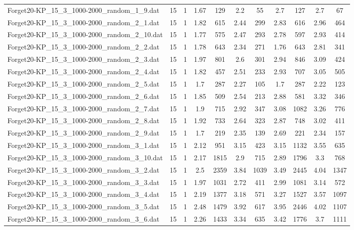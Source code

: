 \begin{table}[!ht]
\begin{tabular}{lcccccccccc}
Forget20-KP\_15\_3\_1000-2000\_random\_1\_9.dat & 15 & 1 & 1.67 & 129 & 2.2 & 55 & 2.7 & 127 & 2.7 & 67 \\
Forget20-KP\_15\_3\_1000-2000\_random\_2\_1.dat & 15 & 1 & 1.82 & 615 & 2.44 & 299 & 2.83 & 616 & 2.96 & 464 \\
Forget20-KP\_15\_3\_1000-2000\_random\_2\_10.dat & 15 & 1 & 1.77 & 575 & 2.47 & 293 & 2.78 & 597 & 2.93 & 414 \\
Forget20-KP\_15\_3\_1000-2000\_random\_2\_2.dat & 15 & 1 & 1.78 & 643 & 2.34 & 271 & 1.76 & 643 & 2.81 & 341 \\
Forget20-KP\_15\_3\_1000-2000\_random\_2\_3.dat & 15 & 1 & 1.97 & 801 & 2.6 & 301 & 2.94 & 846 & 3.09 & 424 \\
Forget20-KP\_15\_3\_1000-2000\_random\_2\_4.dat & 15 & 1 & 1.82 & 457 & 2.51 & 233 & 2.93 & 707 & 3.05 & 505 \\
Forget20-KP\_15\_3\_1000-2000\_random\_2\_5.dat & 15 & 1 & 1.7 & 287 & 2.27 & 105 & 1.7 & 287 & 2.22 & 123 \\
Forget20-KP\_15\_3\_1000-2000\_random\_2\_6.dat & 15 & 1 & 1.85 & 509 & 2.54 & 213 & 2.88 & 581 & 3.32 & 346 \\
Forget20-KP\_15\_3\_1000-2000\_random\_2\_7.dat & 15 & 1 & 1.9 & 715 & 2.92 & 347 & 3.08 & 1082 & 3.26 & 776 \\
Forget20-KP\_15\_3\_1000-2000\_random\_2\_8.dat & 15 & 1 & 1.92 & 733 & 2.64 & 323 & 2.87 & 748 & 3.02 & 411 \\
Forget20-KP\_15\_3\_1000-2000\_random\_2\_9.dat & 15 & 1 & 1.7 & 219 & 2.35 & 139 & 2.69 & 221 & 2.34 & 157 \\
Forget20-KP\_15\_3\_1000-2000\_random\_3\_1.dat & 15 & 1 & 2.12 & 951 & 3.15 & 423 & 3.15 & 1132 & 3.55 & 635 \\
Forget20-KP\_15\_3\_1000-2000\_random\_3\_10.dat & 15 & 1 & 2.17 & 1815 & 2.9 & 715 & 2.89 & 1796 & 3.3 & 768 \\
Forget20-KP\_15\_3\_1000-2000\_random\_3\_2.dat & 15 & 1 & 2.5 & 2359 & 3.84 & 1039 & 3.49 & 2445 & 4.04 & 1347 \\
Forget20-KP\_15\_3\_1000-2000\_random\_3\_3.dat & 15 & 1 & 1.97 & 1031 & 2.72 & 411 & 2.99 & 1081 & 3.14 & 572 \\
Forget20-KP\_15\_3\_1000-2000\_random\_3\_4.dat & 15 & 1 & 2.19 & 1377 & 3.18 & 571 & 3.27 & 1527 & 3.57 & 1097 \\
Forget20-KP\_15\_3\_1000-2000\_random\_3\_5.dat & 15 & 1 & 2.48 & 1479 & 3.92 & 617 & 3.95 & 2446 & 4.02 & 1107 \\
Forget20-KP\_15\_3\_1000-2000\_random\_3\_6.dat & 15 & 1 & 2.26 & 1433 & 3.34 & 635 & 3.42 & 1776 & 3.7 & 1111 \\

\end{tabular}
\end{table}

